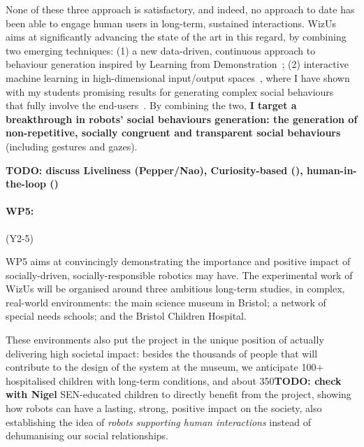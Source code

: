 \documentclass[11pt]{report}
\newcommand{\project}{WizUs\xspace}
\newcommand{\TODO}[1]{{\color{red}\textbf{TODO: #1}}}
\begin{document}
None of these three approach is satisfactory, and indeed, no approach to date
has been able to engage human users in long-term, sustained interactions.
\project aims at significantly advancing the state of the art in this regard, by
combining two emerging techniques: (1) a new data-driven, continuous approach to
behaviour generation inspired by Learning from
Demonstration~\cite{citationneeded}; (2) interactive machine learning in
high-dimensional input/output spaces~\cite{senft2020woz}, where I have shown
with my students promising results for generating complex social
behaviours~\cite{senft2019teaching, winkle2020coach} that fully involve the
end-users~\cite{winkle2020methodology}. By combining the two, \textbf{I target a
breakthrough in robots' social behaviours generation: the generation of
non-repetitive, socially congruent and transparent social
behaviours} (including gestures and gazes).

\TODO{discuss Liveliness (Pepper/Nao), Curiosity-based (\cite{kaplan}),
human-in-the-loop (\cite{senft, winkle})}

\paragraph{WP5: \textbf{\wpFive}} (Y2-5)

WP5 aims at convincingly demonstrating the importance and positive impact of
socially-driven, socially-responsible robotics may have. The experimental work
of \project will be organised around three ambitious long-term studies, in
complex, real-world environments: the main science museum in Bristol; a network
of special needs schools; and the Bristol Children Hospital.

These environments also put the project in the unique position of actually
delivering high societal impact: besides the thousands of people that will
contribute to the design of the system at the museum, we anticipate 100+
hospitalised children with long-term conditions, and about 350\TODO{check with
Nigel} SEN-educated children to directly benefit from the project, showing how
robots can have a lasting, strong, positive impact on the society, also
establishing the idea of \emph{robots supporting human interactions} instead of
dehumanising our social relationships.
\end{document}

